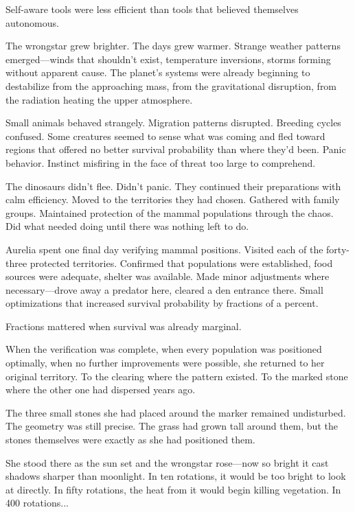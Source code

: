 Self-aware tools were less efficient than tools that believed themselves autonomous.

\scenebreak

The wrongstar grew brighter. The days grew warmer. Strange weather patterns emerged—winds that shouldn't exist, temperature inversions, storms forming without apparent cause. The planet's systems were already beginning to destabilize from the approaching mass, from the gravitational disruption, from the radiation heating the upper atmosphere.

Small animals behaved strangely. Migration patterns disrupted. Breeding cycles confused. Some creatures seemed to sense what was coming and fled toward regions that offered no better survival probability than where they'd been. Panic behavior. Instinct misfiring in the face of threat too large to comprehend.

The dinosaurs didn't flee. Didn't panic. They continued their preparations with calm efficiency. Moved to the territories they had chosen. Gathered with family groups. Maintained protection of the mammal populations through the chaos. Did what needed doing until there was nothing left to do.

Aurelia spent one final day verifying mammal positions. Visited each of the forty-three protected territories. Confirmed that populations were established, food sources were adequate, shelter was available. Made minor adjustments where necessary—drove away a predator here, cleared a den entrance there. Small optimizations that increased survival probability by fractions of a percent.

Fractions mattered when survival was already marginal.

When the verification was complete, when every population was positioned optimally, when no further improvements were possible, she returned to her original territory. To the clearing where the pattern existed. To the marked stone where the other one had dispersed years ago.

The three small stones she had placed around the marker remained undisturbed. The geometry was still precise. The grass had grown tall around them, but the stones themselves were exactly as she had positioned them.

She stood there as the sun set and the wrongstar rose—now so bright it cast shadows sharper than moonlight. In ten rotations, it would be too bright to look at directly. In fifty rotations, the heat from it would begin killing vegetation. In 400 rotations...

